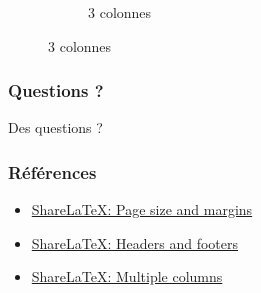 \documentclass{clic_latex_beamer}
\begin{document}
\begin{frame}
\begin{figure}
\begin{subfigure}[b]{0.3\textwidth}
                \caption*{3 colonnes}
        \end{subfigure}
    \end{figure}

 \end{frame}
 
 
 
\begin{frame}
\frametitle{Questions ?}
\begin{center}
\Huge Des questions ?
\end{center}
\end{frame}
 
\begin{frame}
\frametitle{Références}
\begin{itemize}
\item \href{https://www.sharelatex.com/learn/Page_size_and_margins}{ShareLaTeX: Page size and margins}
\item \href{https://www.sharelatex.com/learn/Headers_and_footers}{ShareLaTeX: Headers and footers}
\item \href{https://www.sharelatex.com/learn/Multiple_columns}{ShareLaTeX: Multiple columns}
\end{itemize}
\end{frame}
\end{document}
